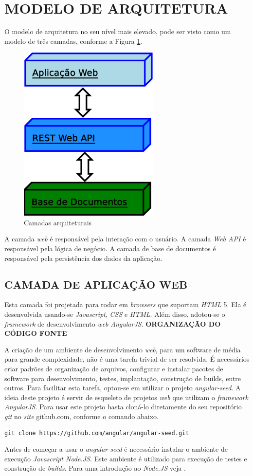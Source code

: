 \section[MODELO DE ARQUITETURA]{MODELO DE ARQUITETURA}

O modelo de arquitetura no seu nível mais elevado, pode ser visto como um modelo de três camadas, conforme a Figura \ref{camadas_arquitetura}.
\begin{figure}[ht]
	\centering
	\includegraphics[width=7cm]{figuras/camadas.eps}
	\caption{Camadas arquiteturais}
	\label{camadas_arquitetura}
\end{figure}

A camada \emph{web} é responsável pela interação com o usuário. 
A camada \emph{Web API} é responsável pela lógica de negócio. 
A camada de base de documentos é responsável pela persistência dos dados da aplicação.


\subsection[CAMADA DE APLICAÇÃO WEB] {CAMADA DE APLICAÇÃO WEB}
Esta camada foi projetada para rodar em \emph{browsers} que suportam \emph{HTML} 5. 
Ela é desenvolvida usando-se \emph{Javascript}, \emph{CSS} e \emph{HTML}. 
Além disso, adotou-se o \emph{framework} de desenvolvimento \emph{web} \emph{AngularJS}. \textbf{ORGANIZAÇÃO DO CÓDIGO FONTE}

A criação de um ambiente de desenvolvimento \emph{web}, para um software de média para grande complexidade, não é uma tarefa trivial de ser resolvida.
É necessários criar padrões de organização de arquivos, configurar e instalar pacotes de software para desenvolvimento, testes, implantação, construção de builds, entre outros.
Para facilitar esta tarefa, optou-se em utilizar o projeto \emph{angular-seed}.
A ideia deste projeto é servir de esqueleto de projetos \emph{web} que utilizam o \emph{framework} \emph{AngularJS}.
Para usar este projeto basta cloná-lo diretamente do seu repositório \emph{git} no \emph{site} github.com, conforme o comando abaixo.
\lstset{language=bash}
\begin{lstlisting}[frame=single]
git clone https://github.com/angular/angular-seed.git
\end{lstlisting}

Antes de começar a usar o \emph{angular-seed} é necessário instalar o ambiente de execução \emph{Javascript Node.JS}. 
Este ambiente é utilizado para execução de testes e construção de \emph{builds}. Para uma introdução ao \emph{Node.JS} veja \cite{Syed2014}.


